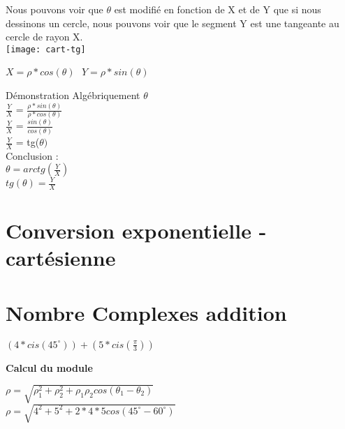 Nous pouvons voir que $\theta$ est modifié en fonction de X et de Y que si nous dessinons un cercle, nous pouvons voir que le segment Y est une tangeante au cercle de rayon X. \\

\texttt{[image: cart-tg]}

$X=\rho * cos(\theta)$ $ $ $ Y=\rho * sin(\theta)$

\vspace{5mm} %
Démonstration Algébriquement $\theta$ \\

$\frac{Y}{X}$ = $\frac{\rho * sin(\theta)}{\rho * cos(\theta)}$ \\
$\frac{Y}{X}$ = $\frac{sin(\theta)}{cos(\theta)}$ \\
$\frac{Y}{X}$ = tg($\theta)$ \\

\vspace{5mm} %
Conclusion : \\

$\theta = arctg(\frac{Y}{X})$ \\

$tg(\theta) = \frac{Y}{X}$


\newpage

\section{Conversion exponentielle - cartésienne}
\vspace{3mm} %



\newpage
\section{Nombre Complexes addition}
\vspace{3mm} %

$(4 * cis(45^{\circ} )) + (5 * cis(\frac{\pi}{3}))$

\vspace{10mm}
\textbf{Calcul du module}
\vspace{5mm}

$\rho = \sqrt{\rho_{1}^{2} + \rho_{2}^{2} + \rho_{1} \rho_{2} cos(\theta_{1} - \theta_{2}) }$ \\

$\rho = \sqrt{4^{2} + 5^{2} + 2 * 4 * 5 cos(45^{\circ} - 60^{\circ})}$ \\

